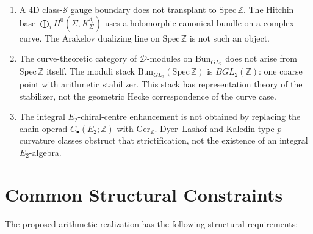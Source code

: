 \begin{enumerate}
parameter. The Yang-Baxter spectral parameter
$u-v$ has no analogue across distinct primes; there is no meromorphic
$1$-form on $\mathrm{Spec}\,\mathbb{Z}$.
\item A 4D class-\(\mathcal{S}\) gauge boundary does not transplant to
\(\overline{\mathrm{Spec}\,\mathbb{Z}}\). The Hitchin base
\(\bigoplus_i H^0(\Sigma,K_\Sigma^{d_i})\) uses a holomorphic
canonical bundle on a complex curve. The Arakelov dualizing line on
\(\overline{\mathrm{Spec}\,\mathbb Z}\) is not such an object.
\item The curve-theoretic category of \(\mathcal{D}\)-modules on
\(\mathrm{Bun}_{GL_{2}}\) does not arise from
\(\mathrm{Spec}\,\mathbb{Z}\) itself.
The moduli stack $\mathrm{Bun}_{GL_{2}}(\mathrm{Spec}\,\mathbb{Z})$
is \(BGL_{2}(\mathbb{Z})\): one coarse point with arithmetic
stabilizer. This stack has representation theory of the stabilizer,
not the geometric Hecke correspondence of the curve case.
\item The integral \(E_{2}\)-chiral-centre enhancement is not obtained
by replacing the chain operad \(C_{\bullet}(E_{2};\mathbb Z)\) with
\(\mathrm{Ger}_{\mathbb Z}\). Dyer--Lashof and Kaledin-type
\(p\)-curvature classes obstruct that strictification, not the
existence of an integral \(E_{2}\)-algebra.
\end{enumerate}

\section{Common Structural Constraints}
\label{v4-arith:app:B:converged-structures}

The proposed arithmetic realization has the following structural
requirements:

